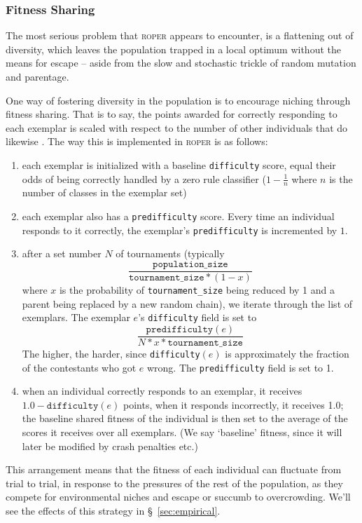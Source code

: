 \subsubsection{Fitness Sharing}

The most serious problem that \textsc{roper} appears to
encounter,
is a flattening out of diversity, which leaves the
population trapped in a local optimum without the means for
escape -- aside from the slow and stochastic trickle of random
mutation and parentage. 

One way of fostering diversity in the population is to encourage
niching through fitness sharing. That is to say, the points awarded for correctly responding to each exemplar is scaled with respect to the number of other individuals that do likewise \cite{rosin97,mckay00}. The way this is implemented in \textsc{roper} is as follows:
{\small
\begin{enumerate}

    \item each exemplar is initialized with a baseline
      \texttt{difficulty} score, equal their odds of being
      correctly handled by a zero rule classifier ($1-\frac{1}{n}$
      where $n$ is the number of classes in the exemplar set)

    \item each exemplar also has a \texttt{predifficulty} score.
      Every time an individual responds to it correctly, the
      exemplar's \texttt{predifficulty} is incremented by $1$.

    \item after a set number $N$ of tournaments (typically
      $$\frac{\texttt{population\_size}}{\texttt{tournament\_size}
      * (1 - x)}$$
      where $x$ is the probability of
      \texttt{tournament\_size} being reduced by 1 and a parent being
      replaced by a new random chain), we iterate through
      the list of exemplars. The exemplar $e$'s \texttt{difficulty}
      field is set to
      $$\frac{\texttt{predifficulty}(e)}{N * x *
      \texttt{tournament\_size}}$$ The higher, the harder, since
      \texttt{difficulty}$(e)$ is approximately 
      the fraction of the contestants who got $e$ wrong.
      The \texttt{predifficulty}
      field is set to 1.  

    \item when an individual correctly responds to an exemplar,
      it receives $1.0 - \texttt{difficulty}(e)$ points, when it responds
      incorrectly, it receives 1.0; the baseline shared
     fitness of the individual is then set to the average of the
      scores it receives over all exemplars. (We say
      `baseline' fitness, since it will later be modified by crash
      penalties etc.)
\end{enumerate}
}
This arrangement means that the fitness of each individual can
fluctuate from trial to trial, in response to the pressures of
the rest of the population, as they compete for environmental
niches and escape or succumb to overcrowding. We'll see the
effects of this strategy in \S~\ref{sec:empirical}.

